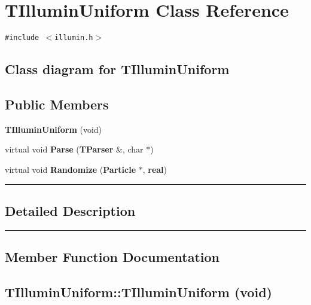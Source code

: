 \section{TIlluminUniform  Class Reference}
\label{TIlluminUniform}


{\tt \#include $<$illumin.h$>$}

\subsection*{Class diagram for TIlluminUniform}
\begin{figure}[H]
\begin{center}
\leavevmode
\setlength{\epsfysize}{2cm}
\end{center}
\end{figure}
\subsection*{Public Members}
\begin{CompactItemize}
\item 
{\bf TIllumin\-Uniform} (void)
\item 
virtual void {\bf Parse} ({\bf TParser} \&, char $\ast$)
\item 
virtual void {\bf Randomize} ({\bf Particle} $\ast$, {\bf real})
\end{CompactItemize}
\vspace{0.4cm}\hrule\vspace{0.2cm}
\subsection*{Detailed Description}
\vspace{0.4cm}\hrule\vspace{0.2cm}
\subsection*{Member Function Documentation}
\label{TIlluminUniform_a0}
\subsection{\setlength{\rightskip}{0pt plus 5cm}TIllumin\-Uniform::TIllumin\-Uniform (void)}

